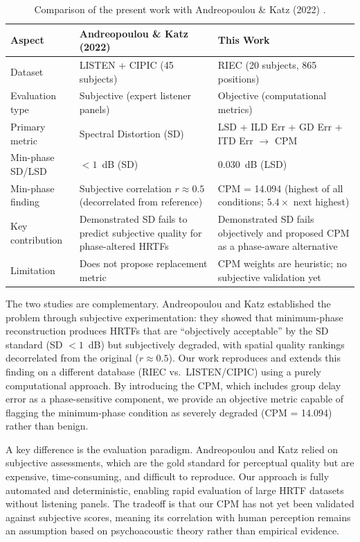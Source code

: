 \documentclass[12pt,a4paper]{article}
\begin{document}
\begin{table}[h!]
\centering
\caption{Comparison of the present work with Andreopoulou \& Katz (2022) \cite{andreopoulou2022}.}
\label{tab:comparison}
\small
\begin{tabular}{p{3.2cm}p{5.5cm}p{5.5cm}}
\toprule
\textbf{Aspect} & \textbf{Andreopoulou \& Katz (2022)} & \textbf{This Work} \\
\midrule
Dataset & LISTEN + CIPIC (45 subjects) & RIEC (20 subjects, 865 positions) \\
Evaluation type & Subjective (expert listener panels) & Objective (computational metrics) \\
Primary metric & Spectral Distortion (SD) & LSD + ILD Err + GD Err + ITD Err $\to$ CPM \\
Min-phase SD/LSD & $< 1$~dB (SD) & 0.030~dB (LSD) \\
Min-phase finding & Subjective correlation $r \approx 0.5$ (decorrelated from reference) & CPM = 14.094 (highest of all conditions; $5.4\times$ next highest) \\
Key contribution & Demonstrated SD fails to predict subjective quality for phase-altered HRTFs & Demonstrated SD fails objectively and proposed CPM as a phase-aware alternative \\
Limitation & Does not propose replacement metric & CPM weights are heuristic; no subjective validation yet \\
\bottomrule
\end{tabular}
\end{table}

The two studies are complementary. Andreopoulou and Katz \cite{andreopoulou2022} established the problem through subjective experimentation: they showed that minimum-phase reconstruction produces HRTFs that are ``objectively acceptable'' by the SD standard (SD $< 1$~dB) but subjectively degraded, with spatial quality rankings decorrelated from the original ($r \approx 0.5$). Our work reproduces and extends this finding on a different database (RIEC vs.\ LISTEN/CIPIC) using a purely computational approach. By introducing the CPM, which includes group delay error as a phase-sensitive component, we provide an objective metric capable of flagging the minimum-phase condition as severely degraded (CPM = 14.094) rather than benign.

A key difference is the evaluation paradigm. Andreopoulou and Katz relied on subjective assessments, which are the gold standard for perceptual quality but are expensive, time-consuming, and difficult to reproduce. Our approach is fully automated and deterministic, enabling rapid evaluation of large HRTF datasets without listening panels. The tradeoff is that our CPM has not yet been validated against subjective scores, meaning its correlation with human perception remains an assumption based on psychoacoustic theory rather than empirical evidence.
\end{document}
